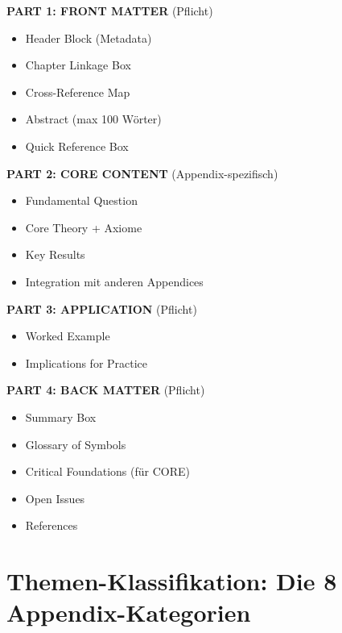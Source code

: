 \documentclass[12pt,a4paper]{article}
\begin{document}
\begin{tcolorbox}[colback=yellow!5!white, colframe=yellow!75!black, 
    title=Standard Appendix Template]

\textbf{PART 1: FRONT MATTER} (Pflicht)
\begin{itemize}[nosep]
\item Header Block (Metadata)
\item Chapter Linkage Box
\item Cross-Reference Map
\item Abstract (max 100 Wörter)
\item Quick Reference Box
\end{itemize}

\textbf{PART 2: CORE CONTENT} (Appendix-spezifisch)
\begin{itemize}[nosep]
\item Fundamental Question
\item Core Theory + Axiome
\item Key Results
\item Integration mit anderen Appendices
\end{itemize}

\textbf{PART 3: APPLICATION} (Pflicht)
\begin{itemize}[nosep]
\item Worked Example
\item Implications for Practice
\end{itemize}

\textbf{PART 4: BACK MATTER} (Pflicht)
\begin{itemize}[nosep]
\item Summary Box
\item Glossary of Symbols
\item Critical Foundations (für CORE)
\item Open Issues
\item References
\end{itemize}

\end{tcolorbox}

\section{Themen-Klassifikation: Die 8 Appendix-Kategorien}
\end{document}
